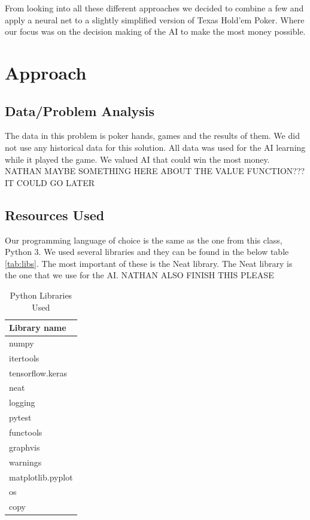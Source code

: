 From looking into all these different approaches we decided to combine a few and apply a neural net to a slightly simplified version of Texas Hold'em Poker. Where our focus was on the decision making of the AI to make the most money possible.

\section{Approach}
\subsection{Data/Problem Analysis}
The data in this problem is poker hands, games and the results of them. We did not use any historical data for this solution. All data was used for the AI learning while it played the game. We valued AI that could win the most money. NATHAN MAYBE SOMETHING HERE ABOUT THE VALUE FUNCTION??? IT COULD GO LATER

\subsection{Resources Used}
Our programming language of choice is the same as the one from this class, Python 3. We used several libraries and they can be found in the below table \autoref{tab:libs}. The most important of these is the Neat library. The Neat library is the one that we use for the AI. NATHAN ALSO FINISH THIS PLEASE
\begin{table}[H]
    \caption{Python Libraries Used}
    \centering
    \begin{tabular}{ | l |}
    \hline
        Library name \\
        \hline
        \hline
        numpy \\
        itertools \\
        tensorflow.keras \\
        neat \\
        logging \\
        pytest \\
        functools \\
        graphvis \\
        warnings \\
        matplotlib.pyplot \\
        os \\
        copy \\
        
    \hline
    \end{tabular}
    \label{tab:libs}
\end{table}

